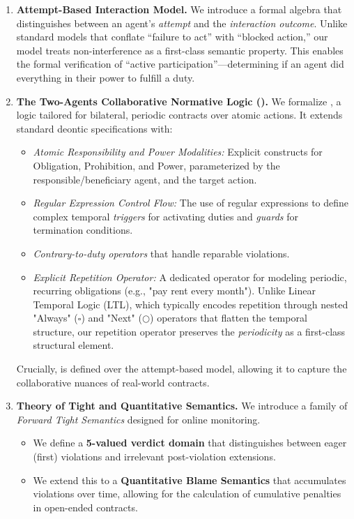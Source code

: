 \documentclass{article}
\begin{document}
\begin{enumerate}[label={(Con\arabic*)}]

\item \textbf{Attempt-Based Interaction Model.}
We introduce a formal algebra that distinguishes between an agent's \emph{attempt} and the \emph{interaction outcome}.
Unlike standard models that conflate ``failure to act'' with ``blocked action,'' our model treats non-interference as a first-class semantic property.
This enables the formal verification of ``active participation''—determining if an agent did everything in their power to fulfill a duty.

\item \textbf{The Two-Agents Collaborative Normative Logic (\cDL).}
We formalize \cDL, a logic tailored for bilateral, periodic contracts over atomic actions.
It extends standard deontic specifications with:
\begin{itemize}
  \item \emph{Atomic Responsibility and Power Modalities:} Explicit constructs for Obligation, Prohibition, and Power, parameterized by the responsible/beneficiary agent,  and the target action.
  \item \emph{Regular Expression Control Flow:} The use of regular expressions to define complex temporal \emph{triggers} for activating duties and \emph{guards} for termination conditions.
  \item \emph{Contrary-to-duty operators} that handle reparable violations.
  \item \emph{Explicit Repetition Operator:} A dedicated operator for modeling periodic, recurring obligations (e.g., "pay rent every month"). Unlike Linear Temporal Logic (LTL), which typically encodes repetition through nested "Always" ($\square$) and "Next" ($\bigcirc$) operators that flatten the temporal structure, our repetition operator preserves the \emph{periodicity} as a first-class structural element.
\end{itemize}
Crucially, \cDL is defined over the attempt-based model, allowing it to capture the collaborative nuances of real-world contracts.

\item \textbf{Theory of Tight and Quantitative Semantics.}
We introduce a family of \emph{Forward Tight Semantics} designed for online monitoring.
\begin{itemize}
    \item We define a \textbf{5-valued verdict domain} that distinguishes between eager (first) violations and irrelevant post-violation extensions.
    \item We extend this to a \textbf{Quantitative Blame Semantics} that accumulates violations over time, allowing for the calculation of cumulative penalties in open-ended contracts.
\end{itemize}


\end{enumerate}
\end{document}
